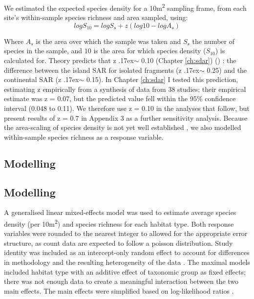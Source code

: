 We estimated the expected species density for a 10m\textsuperscript{2} sampling frame, from each site's within-sample species richness and area sampled, using: 
\begin{equation}
log S_{10} = log S_s + z(log 10 - log A_s)
\end{equation}


Where $A_s$ is the area over which the sample was taken and $S_s$ the number of species in the sample, and $10$ is the area for which species density ($S_{10}$) is calculated for. Theory predicts that z {\raise.17ex\hbox{$\scriptstyle\sim$}} 0.10 
\ifappendixStyle %
(Chapter \ref{ch:sdar})%
\else
(\citealt{Phillips:2015sdar})
\fi
: the difference between the island SAR for isolated fragments (z {\raise.17ex\hbox{$\scriptstyle\sim$}} 0.25) and the continental SAR (z {\raise.17ex\hbox{$\scriptstyle\sim$}} 0.15). 
\ifappendixStyle %
In Chapter \ref{ch:sdar} I %
\else
\cite{Phillips:2015sdar} 
\fi
tested this prediction, estimating z empirically from a synthesis of data from 38 studies; their empirical estimate was z = 0.07, but the predicted value fell within the 95\% confidence interval (0.048 to 0.11). We therefore use z = 0.10 in the analyses that follow, but present results of z = 0.7 in Appendix 3 as a further sensitivity analysis. Because the area-scaling of species density is not yet well established \citep[e.g.][]{Giladi:2014bio}, we also modelled within-sample species richness as a response variable.

\ifappendixStyle %
\subsection{Modelling}%
\else
\subsection*{Modelling}
\fi

A generalised linear mixed-effects model was used to estimate average species density (per 10m\textsuperscript{2}) and species richness for each habitat type. Both response variables were rounded to the nearest integer to allowed for the appropriate error structure, as count data are expected to follow a poisson distribution. Study identity was included as an intercept-only random effect to account for differences in methodology and the resulting heterogeneity of the data \citep{Zuur:2009me}. The maximal models included habitat type with an additive effect of taxonomic group as fixed effects; there was not enough data to create a meaningful interaction between the two main effects. The main effects were simplified based on log-likelihood ratios \citep{Zuur:2009me,Crawley:2012r}.

